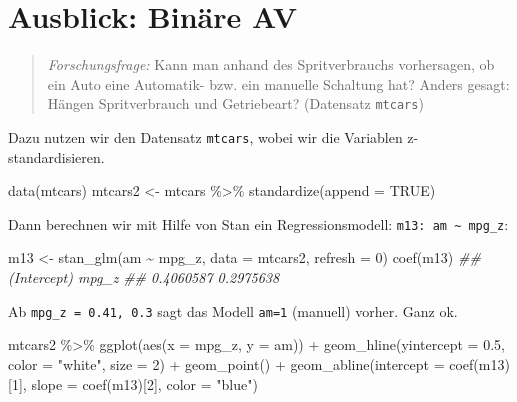 \documentclass[
  a4paper,
  DIV=11]{scrreprt}
\newenvironment{Shaded}{\begin{snugshade}}{\end{snugshade}}
\newcommand{\AttributeTok}[1]{\textcolor[rgb]{0.40,0.45,0.13}{#1}}
\newcommand{\ConstantTok}[1]{\textcolor[rgb]{0.56,0.35,0.01}{#1}}
\newcommand{\DecValTok}[1]{\textcolor[rgb]{0.68,0.00,0.00}{#1}}
\newcommand{\DocumentationTok}[1]{\textcolor[rgb]{0.37,0.37,0.37}{\textit{#1}}}
\newcommand{\FloatTok}[1]{\textcolor[rgb]{0.68,0.00,0.00}{#1}}
\newcommand{\FunctionTok}[1]{\textcolor[rgb]{0.28,0.35,0.67}{#1}}
\newcommand{\NormalTok}[1]{\textcolor[rgb]{0.00,0.23,0.31}{#1}}
\newcommand{\OtherTok}[1]{\textcolor[rgb]{0.00,0.23,0.31}{#1}}
\newcommand{\SpecialCharTok}[1]{\textcolor[rgb]{0.37,0.37,0.37}{#1}}
\newcommand{\StringTok}[1]{\textcolor[rgb]{0.13,0.47,0.30}{#1}}
\theoremstyle{definition}
\theoremstyle{remark}
\begin{document}
\hypertarget{ausblick-binuxe4re-av}{%
\section{Ausblick: Binäre AV}\label{ausblick-binuxe4re-av}}

\begin{quote}
\emph{Forschungsfrage:} Kann man anhand des Spritverbrauchs vorhersagen,
ob ein Auto eine Automatik- bzw. ein manuelle Schaltung hat? Anders
gesagt: Hängen Spritverbrauch und Getriebeart? (Datensatz
\texttt{mtcars})
\end{quote}

Dazu nutzen wir den Datensatz \texttt{mtcars}, wobei wir die Variablen
z-standardisieren.

\begin{Shaded}
\begin{Highlighting}[]
\FunctionTok{data}\NormalTok{(mtcars)}
\NormalTok{mtcars2 }\OtherTok{\textless{}{-}}
\NormalTok{  mtcars }\SpecialCharTok{\%\textgreater{}\%} 
  \FunctionTok{standardize}\NormalTok{(}\AttributeTok{append =} \ConstantTok{TRUE}\NormalTok{)}
\end{Highlighting}
\end{Shaded}

Dann berechnen wir mit Hilfe von Stan ein Regressionsmodell:
\texttt{m13:\ am\ \textasciitilde{}\ mpg\_z}:

\begin{Shaded}
\begin{Highlighting}[]
\NormalTok{m13 }\OtherTok{\textless{}{-}}
  \FunctionTok{stan\_glm}\NormalTok{(am }\SpecialCharTok{\textasciitilde{}}\NormalTok{ mpg\_z, }
           \AttributeTok{data =}\NormalTok{ mtcars2, }
           \AttributeTok{refresh =} \DecValTok{0}\NormalTok{)}
\FunctionTok{coef}\NormalTok{(m13)}
\DocumentationTok{\#\# (Intercept)       mpg\_z }
\DocumentationTok{\#\#   0.4060587   0.2975638}
\end{Highlighting}
\end{Shaded}

Ab \texttt{mpg\_z\ =\ 0.41,\ 0.3} sagt das Modell \texttt{am=1}
(manuell) vorher. Ganz ok.

\begin{Shaded}
\begin{Highlighting}[]
\NormalTok{mtcars2 }\SpecialCharTok{\%\textgreater{}\%} 
  \FunctionTok{ggplot}\NormalTok{(}\FunctionTok{aes}\NormalTok{(}\AttributeTok{x =}\NormalTok{ mpg\_z, }\AttributeTok{y =}\NormalTok{ am)) }\SpecialCharTok{+}
  \FunctionTok{geom\_hline}\NormalTok{(}\AttributeTok{yintercept =} \FloatTok{0.5}\NormalTok{, }\AttributeTok{color =} \StringTok{"white"}\NormalTok{, }\AttributeTok{size =} \DecValTok{2}\NormalTok{) }\SpecialCharTok{+}
  \FunctionTok{geom\_point}\NormalTok{() }\SpecialCharTok{+}
  \FunctionTok{geom\_abline}\NormalTok{(}\AttributeTok{intercept =} \FunctionTok{coef}\NormalTok{(m13)[}\DecValTok{1}\NormalTok{],}
              \AttributeTok{slope =} \FunctionTok{coef}\NormalTok{(m13)[}\DecValTok{2}\NormalTok{],}
              \AttributeTok{color =} \StringTok{"blue"}\NormalTok{) }
\end{Highlighting}
\end{Shaded}
\end{document}
